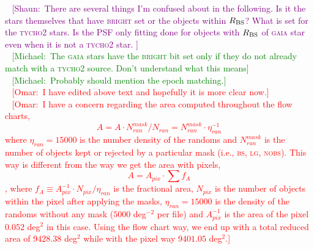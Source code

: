 \documentclass[fleqn,usenatbib]{mnras}
\newcommand{\mike}[1]{~\newline\noindent \textcolor{Green}{{ [Michael:~{#1}]\\}}}
\newcommand{\shaun}[1]{~\newline\noindent \textcolor{Purple}{{ [Shaun:~{#1}]\\}}}
\newcommand{\omar}[1]{~\newline\noindent \textcolor{red}{{ [Omar:~{#1}]\\}}}
\newcommand{\BRIGHT}{\textsc{bright}\xspace}
\newcommand{\BS}{\textsc{bs}\xspace}
\newcommand{\GAIA}{\textsc{gaia}\xspace}
\newcommand{\LG}{\textsc{lg}\xspace}
\newcommand{\NOBS}{\textsc{nobs}\xspace}
\newcommand{\Tycho}{\textsc{tycho2}\xspace}
\begin{document}
\shaun{There are several things I'm confused about in the following.  Is it the stars themselves that have \BRIGHT set or the objects within $R_{\rm BS}$? What is set for the \Tycho stars. Is the PSF only fitting done for objects with $R_{\rm BS}$ of \GAIA star even when it is not a \Tycho star. }
\mike{The \GAIA stars have the \BRIGHT bit set only if they do not already match with a \Tycho  source. Don't understand what this means}
\mike{Probably should mention the epoch matching.}
\omar{I have edited above text and hopefully it is more clear now.}
\omar{I have a concern regarding the area computed throughout the flow charts, $$A = A \cdot N_{ran}^{mask}/N_{ran} = N_{ran}^{mask} \cdot \eta_{ran}^{-1}$$ where $\eta_{ran}=15000$ is the number density of the randoms and $N_{ran}^{mask}$ is the number of objects kept or rejected by a particular mask (i.e., \BS, \LG, \NOBS). This way is different from the way we get the area with pixels, $$A = A_{pix}\cdot\sum f_{A}$$, where $f_{A} \equiv A_{pix}^{-1}\cdot N_{pix}/\eta_{ran}$ is the fractional area, $N_{pix}$ is the number of objects within the pixel after applying the masks, $\eta_{ran}=15000$ is the density of the randoms without any mask ($5000$ deg$^{-2}$ per file) and $A_{pix}^{-1}$ is the area of the pixel $0.052$ deg$^2$ in this case. Using the flow chart way, we end up with a total reduced area of $9428.38$ deg$^{2}$ while with the pixel way $9401.05$ deg$^{2}$.}
\end{document}
